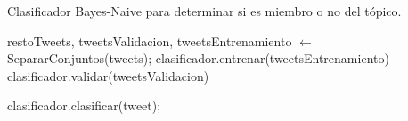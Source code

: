 \begin{algorithm}
	\caption{Clasificador Bayes-Naive para determinar si es miembro o no del tópico.}\label{CrearClasificador}
	\begin{algorithmic}[1]
		\State restoTweets, tweetsValidacion, tweetsEntrenamiento $\gets$ SepararConjuntos(tweets);
		\State clasificador.entrenar(tweetsEntrenamiento)
		\State clasificador.validar(tweetsValidacion)
		
			 \State clasificador.clasificar(tweet);
		\EndFor
		\EndFunction
	\end{algorithmic}
\end{algorithm}

